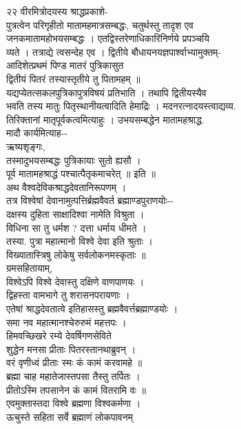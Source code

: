 \documentclass[11pt, openany]{book}
\begin{document}
{{{{{{{{{{{{{{{{{{{{{{{{{{{{{{{{{{{{{{२२ }{वीरमित्रोदयस्य श्राद्धप्रकाशे-}{\\
पुत्रत्वेन परिगृहीतो मातामहमात्रसम्बद्धः, चतुर्थस्तु तादृश एव\\
जनकमातामहोभयसम्बद्धः । एतद्विस्तरेणाधिकारिनिर्णये प्रपञ्चयि\\
व्यते । तत्राद्ये त्वसन्देह एव । द्वितीये
बौधायनयज्ञपार्श्वाभ्यामुक्तम्-\\
आदिशेत्प्रथमं पिण्ड मातरं पुत्रिकासुत \textbar{}\\
द्वितीयं पितरं तस्यास्तृतीये तु पितामहम् ॥\\
यद्यप्येतत्सकलपुत्रिकापुत्रविषयं प्रतिभाति । }{तथापि}{ द्वितीयस्यैव\\
भवति तस्य मातुः पितृस्थानीयत्वादिति हेमाद्रिः ।
मदनरत्नादयस्त्वाद्यव्य.\\
तिरिक्तानां मातृपूर्वकत्वमित्याहुः । उभयसम्बद्धेन मातामहश्राद्ध.\\
मादौ कार्यमित्याह-\/-\\
ऋष्यशृङ्गः,\\
तस्मादुभयसम्बद्धः पुत्रिकायाः सुतो ह्यसौ ।\\
पूर्व मातामहश्राद्धं पश्चात्पैतृकमाचरेत् ॥ इति ॥\\
अथ वैश्वदेविकश्राद्धदेवतानिरूपणम् ।\\
तत्र विश्वेषां देवानामुत्पत्तिर्ब्रह्मवैवर्त ब्रह्माण्डपुराणयोः-\/-\\
दक्षस्य दुहिता साक्षादिश्वा नामेति विश्रुता ।\\
विधिना सा तु धर्मश ? दत्ता धर्माय धीमते ।\\
तस्या. पुत्रा महात्मानो विश्वे देवा इति श्रुताः ।\\
विख्यातास्त्रिषु लोकेषु सर्वलोकनमस्कृताः ॥\\
ग्रमसहितायाम्,\\
विश्वेऽपि विश्वे देवास्तु दक्षिणे वाणपाणयः ।\\
द्विहस्ता वामभागे तु शरासनपरायणाः ।\\
एतेषां श्राद्धदेवतात्वे इतिहासस्तु ब्रह्मवैवर्त्तब्रह्माण्डयोः ।\\
समा नव महात्मानश्चेरुरुमं महत्तपः ।\\
हिमवच्छिखरे रम्ये देवर्षिगणसेविते \textbar{}\textbar{}\\
शुद्धेन मनसा प्रीताः पितरस्तानथाब्रुवन् ।\\
वरं वृणीध्वं प्रीताः स्मः कं कामं करवामहे ॥\\
ब्रह्मा चाह महातेजास्तपसा तैस्तु तर्पितः ।\\
प्रीतोऽस्मि तपसानेन कं कामं वितरामि वः ॥\\
एवमुक्तास्तदा विश्वे ब्रह्मणा विश्वकर्मणा ।\\
ऊचुस्ते सहिता सर्वे ब्रह्माणं लोकपावनम् \textbar{}\textbar{}\\


}}}}}}}}}}}}}}}}}}}}}}}}}}}}}}}}}}}}}}
\end{document}
